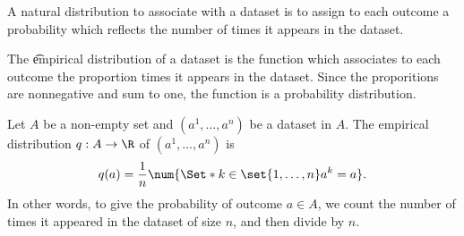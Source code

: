

A natural distribution to associate with a dataset is to assign to each outcome a probability which reflects the number of times it appears in the dataset.


The \t{empirical distribution} of a dataset is the function which associates to each outcome the proportion times it appears in the dataset.
Since the proporitions are nonnegative and sum to one, the function is a probability distribution.


Let $A$ be a non-empty set and $(a^1, \dots , a^n)$ be a dataset in $A$.
The empirical distribution $q: A \to \R $ of $(a^1, \dots , a^n)$ is
  \[
q(a) = \frac{1}{n} \num{\Set*{k \in \set{1, \dots , n}}{a^k = a}}.
  \]
In other words, to give the probability of outcome $a \in A$, we count the number of times it appeared in the dataset of size $n$, and then divide by $n$.

\blankpage
